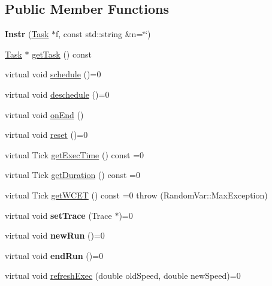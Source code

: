 \subsection*{Public Member Functions}
\begin{DoxyCompactItemize}
\item 
{\bfseries Instr} (\hyperlink{classRTSim_1_1Task}{Task} $\ast$f, const std\+::string \&n=\char`\"{}\char`\"{})\hypertarget{classRTSim_1_1Instr_a024f8fde8fc46ecbb905abd08262cacd}{}\label{classRTSim_1_1Instr_a024f8fde8fc46ecbb905abd08262cacd}

\item 
\hyperlink{classRTSim_1_1Task}{Task} $\ast$ \hyperlink{classRTSim_1_1Instr_af256fe488d8836d624e9fbc193bbe3aa}{get\+Task} () const 
\item 
virtual void \hyperlink{classRTSim_1_1Instr_abc0649d21500454888e17e6cf33513d0}{schedule} ()=0
\item 
virtual void \hyperlink{classRTSim_1_1Instr_a747331d23e49cd1e976508bba6621d86}{deschedule} ()=0
\item 
virtual void \hyperlink{classRTSim_1_1Instr_a5cef8bd2a108f0781087ed436c3c31e7}{on\+End} ()
\item 
virtual void \hyperlink{classRTSim_1_1Instr_af76965cd2bc75ccbeaa1737cceebaa87}{reset} ()=0
\item 
virtual Tick \hyperlink{classRTSim_1_1Instr_a52e0132196ab12de7083a76351c3a883}{get\+Exec\+Time} () const =0
\item 
virtual Tick \hyperlink{classRTSim_1_1Instr_acd03599661897f2bd4ed4eb67a9d91de}{get\+Duration} () const =0
\item 
virtual Tick \hyperlink{classRTSim_1_1Instr_aa47f89b0339f259998576787d787a64a}{get\+W\+C\+ET} () const =0  throw (\+Random\+Var\+::\+Max\+Exception)
\item 
virtual void {\bfseries set\+Trace} (Trace $\ast$)=0\hypertarget{classRTSim_1_1Instr_aa373c25bab070e7f4b6cf3e1a6995f4e}{}\label{classRTSim_1_1Instr_aa373c25bab070e7f4b6cf3e1a6995f4e}

\item 
virtual void {\bfseries new\+Run} ()=0\hypertarget{classRTSim_1_1Instr_afd29df0083506c056f9a9c53bf1f8f28}{}\label{classRTSim_1_1Instr_afd29df0083506c056f9a9c53bf1f8f28}

\item 
virtual void {\bfseries end\+Run} ()=0\hypertarget{classRTSim_1_1Instr_a6cb380d238f3e427ca83159bcd139503}{}\label{classRTSim_1_1Instr_a6cb380d238f3e427ca83159bcd139503}

\item 
virtual void \hyperlink{classRTSim_1_1Instr_a2cc82b248c136c45e9d7132a1bff46da}{refresh\+Exec} (double old\+Speed, double new\+Speed)=0
\end{DoxyCompactItemize}
